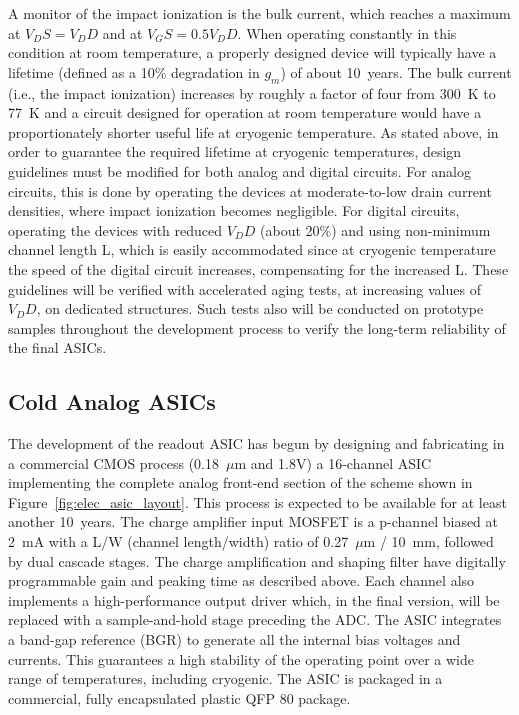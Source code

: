 A monitor of the impact ionization is the bulk current, which reaches a maximum at $V_DS = V_DD$ and at $V_GS = 0.5 V_DD$. 
When operating constantly in this condition at room temperature, a properly designed device 
will typically have a lifetime (defined as a 10\% degradation in $g_m$) of about 10~years. 
The bulk current (i.e., the impact ionization) increases by roughly a factor of four from 300~K to 77~K 
\cite{CMOS-reliability} and a circuit designed for operation at room temperature would have 
a proportionately shorter useful life at cryogenic temperature. As stated above, in order to guarantee 
the required lifetime at cryogenic temperatures, design guidelines must be modified for both analog 
and digital circuits. For analog circuits, this is done by operating the devices at moderate-to-low 
drain current densities, where impact ionization becomes negligible. For digital circuits, 
operating the devices with reduced $V_DD$ (about 20\%) and using non-minimum channel length L, 
which is easily accommodated since at cryogenic temperature the speed of the digital circuit increases, 
compensating for the increased L. These guidelines will be verified with accelerated aging tests, 
at increasing values of $V_DD$, on dedicated structures. Such tests also will be conducted on 
prototype samples throughout the development process to verify the long-term reliability of the final ASICs.

%
\subsection{Cold Analog ASICs}
\label{subsec:fe-CMOS-analog}

The development of the readout ASIC has begun by designing and fabricating in a commercial CMOS
process (0.18~$\mu$m and 1.8V) a 16-channel
ASIC implementing the complete analog front-end section of the scheme shown in Figure~\ref{fig:elec_asic_layout}. 
This process is expected to be available for at least another 10~years. 
The charge amplifier input MOSFET is a p-channel biased at 2~mA with a L/W (channel length/width) ratio
of 0.27~$\mu$m / 10~mm, followed by dual cascade stages.
The charge amplification and shaping filter have
digitally programmable gain and peaking time as described above.
Each channel also implements a high-performance output driver which, in the
final version, will be replaced with a sample-and-hold stage preceding the ADC.
The ASIC integrates a band-gap reference (BGR)  to generate all the internal bias voltages and currents.
This guarantees a high stability of the operating point over a wide range of
temperatures, including cryogenic.
The ASIC is packaged in a commercial, fully encapsulated plastic QFP 80 package.

